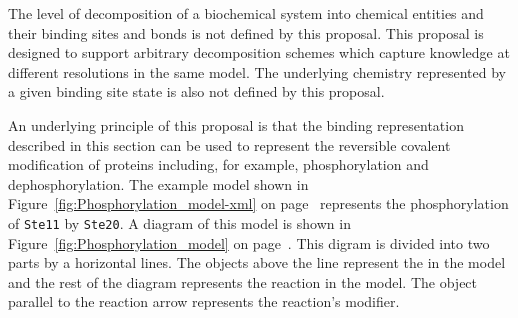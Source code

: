 \documentclass{cekarticle}
\begin{document}
The level of decomposition of a biochemical system into chemical entities and their binding sites and
bonds is not defined by this proposal.  This proposal is designed to support arbitrary decomposition
schemes which capture knowledge at different resolutions in the same model. The
underlying chemistry represented by a given binding site state is also not defined by this proposal.

An underlying principle of this proposal is that the binding
representation described in this section can be used to represent
the reversible covalent modification of proteins including, for
example, phosphorylation and dephosphorylation.  The example model
shown in Figure~\ref{fig:Phosphorylation_model-xml} on
page~\pageref{fig:Phosphorylation_model-xml} represents the
phosphorylation of \texttt{Ste11} by \texttt{Ste20}.  A diagram of
this model is shown in Figure~\ref{fig:Phosphorylation_model} on
page~\pageref{fig:Phosphorylation_model}.  This digram is divided
into two parts by a horizontal lines.  The objects above the line
represent the  in the model and the rest of
the diagram represents the reaction in the model.  The object
parallel to the reaction arrow represents the reaction's modifier.
\end{document}
